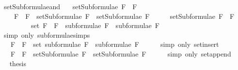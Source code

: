 \begin{isabellebody}
\ setSubformulae{\isacharunderscore}and{\isacharcolon}\ \isanewline
\ \ {\isachardoublequoteopen}setSubformulae\ {\isacharparenleft}F{}\ \isactrlbold {\isasymand}\ F{}{\isacharparenright}\ \isanewline
\ \ \ {\isacharequal}\ {\isacharbraceleft}F{}\ \isactrlbold {\isasymand}\ F{}{\isacharbraceright}\ {\isasymunion}\ {\isacharparenleft}setSubformulae\ F{}\ {\isasymunion}\ setSubformulae\ F{}{\isacharparenright}{\isachardoublequoteclose}\isanewline
%
\isadelimproof
%
\endisadelimproof
%
\isatagproof
{}\isamarkupfalse%
\ {\isacharminus}\isanewline
\ \ \isamarkupfalse%
\ {\isachardoublequoteopen}setSubformulae\ {\isacharparenleft}F{}\ \isactrlbold {\isasymand}\ F{}{\isacharparenright}\ \isanewline
\ \ \ \ \ \ \ \ {\isacharequal}\ set\ {\isacharparenleft}{\isacharparenleft}F{}\ \isactrlbold {\isasymand}\ F{}{\isacharparenright}\ {\isacharhash}\ {\isacharparenleft}subformulae\ F{}\ {\isacharat}\ subformulae\ F{}{\isacharparenright}{\isacharparenright}{\isachardoublequoteclose}\isanewline
\ \ \ \ \isamarkupfalse%
\ {\isacharparenleft}simp\ only{\isacharcolon}\ subformulae{\isachardot}simps{\isacharparenleft}{}{\isacharparenright}{\isacharparenright}\isanewline
\ \ \isamarkupfalse%
\ \isamarkupfalse%
\ {\isachardoublequoteopen}{\isasymdots}\ {\isacharequal}\ {\isacharbraceleft}F{}\ \isactrlbold {\isasymand}\ F{}{\isacharbraceright}\ {\isasymunion}\ {\isacharparenleft}set\ {\isacharparenleft}subformulae\ F{}\ {\isacharat}\ subformulae\ F{}{\isacharparenright}{\isacharparenright}{\isachardoublequoteclose}\isanewline
\ \ \ \ \isamarkupfalse%
\ {\isacharparenleft}simp\ only{\isacharcolon}\ set{\isacharunderscore}insert{\isacharparenright}\isanewline
\ \ \isamarkupfalse%
\ \isamarkupfalse%
\ {\isachardoublequoteopen}{\isasymdots}\ {\isacharequal}\ {\isacharbraceleft}F{}\ \isactrlbold {\isasymand}\ F{}{\isacharbraceright}\ {\isasymunion}\ {\isacharparenleft}setSubformulae\ F{}\ {\isasymunion}\ setSubformulae\ F{}{\isacharparenright}{\isachardoublequoteclose}\isanewline
\ \ \ \ \isamarkupfalse%
\ {\isacharparenleft}simp\ only{\isacharcolon}\ set{\isacharunderscore}append{\isacharparenright}\isanewline
\ \ \isamarkupfalse%
\ \isamarkupfalse%
\ {\isacharquery}thesis\isanewline

\end{isabellebody}
